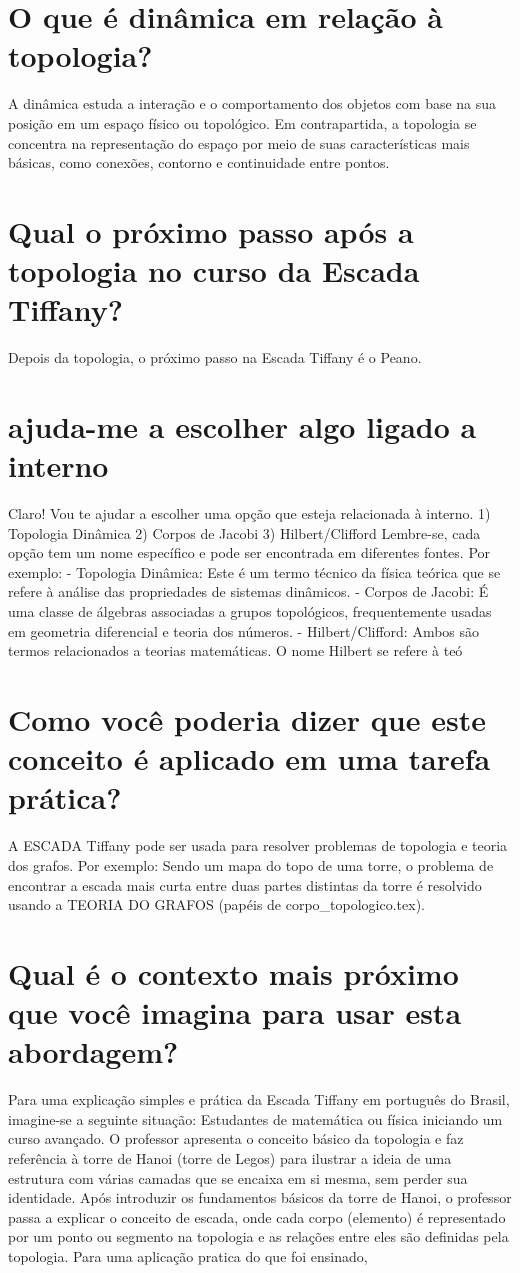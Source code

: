 \documentclass[11pt,a4paper]{article}
\begin{document}
\section{O que é dinâmica em relação à topologia?}
A dinâmica estuda a interação e o comportamento dos objetos com base na sua posição em um espaço físico ou topológico. Em contrapartida, a topologia se concentra na representação do espaço por meio de suas características mais básicas, como conexões, contorno e continuidade entre pontos.

\section{Qual o próximo passo após a topologia no curso da Escada Tiffany?}
Depois da topologia, o próximo passo na Escada Tiffany é o Peano.

\section{ajuda-me a escolher algo ligado a interno}
Claro! Vou te ajudar a escolher uma opção que esteja relacionada à interno. 1) Topologia Dinâmica 2) Corpos de Jacobi 3) Hilbert/Clifford Lembre-se, cada opção tem um nome específico e pode ser encontrada em diferentes fontes. Por exemplo: - Topologia Dinâmica: Este é um termo técnico da física teórica que se refere à análise das propriedades de sistemas dinâmicos. - Corpos de Jacobi: É uma classe de álgebras associadas a grupos topológicos, frequentemente usadas em geometria diferencial e teoria dos números. - Hilbert/Clifford: Ambos são termos relacionados a teorias matemáticas. O nome Hilbert se refere à teó

\section{Como você poderia dizer que este conceito é aplicado em uma tarefa prática?}
A ESCADA Tiffany pode ser usada para resolver problemas de topologia e teoria dos grafos. Por exemplo: Sendo um mapa do topo de uma torre, o problema de encontrar a escada mais curta entre duas partes distintas da torre é resolvido usando a TEORIA DO GRAFOS (papéis de corpo\_topologico.tex).

\section{Qual é o contexto mais próximo que você imagina para usar esta abordagem?}
Para uma explicação simples e prática da Escada Tiffany em português do Brasil, imagine-se a seguinte situação: Estudantes de matemática ou física iniciando um curso avançado. O professor apresenta o conceito básico da topologia e faz referência à torre de Hanoi (torre de Legos) para ilustrar a ideia de uma estrutura com várias camadas que se encaixa em si mesma, sem perder sua identidade. Após introduzir os fundamentos básicos da torre de Hanoi, o professor passa a explicar o conceito de escada, onde cada corpo (elemento) é representado por um ponto ou segmento na topologia e as relações entre eles são definidas pela topologia. Para uma aplicação pratica do que foi ensinado,
\end{document}
